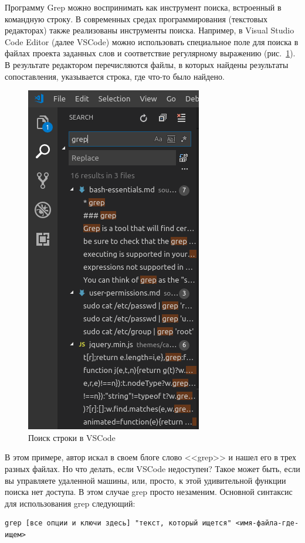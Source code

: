 \documentclass[12pt]{article}
\begin{document}
Программу Grep можно воспринимать как инструмент поиска, встроенный в командную
строку. В современных средах программирования (текстовых редакторах)
также реализованы инструменты поиска. Например, в Visual Studio Code Editor (далее VSCode)
можно использовать специальное поле для поиска в файлах проекта
заданных слов и соответствие регулярному выражению (рис.~\ref{fig:vscodesearch}). В
результате редактором перечисляются файлы, в которых найдены
результаты сопоставления, указывается строка, где что-то было найдено.
\begin{figure}[tbh]\centering

\includegraphics[width=0.5\linewidth]{blog/2019/bash-essentials/vscode-search.png}

\caption{Поиск строки в VSCode}
\label{fig:vscodesearch}
\end{figure}
В этом примере, автор искал в своем блоге слово <<grep>> и нашел его в
трех разных файлах. Но что делать, если VSCode недоступен? Такое может
быть, если вы управляете удаленной машины, или, просто, к этой
удивительной функции поиска нет доступа. В этом случае grep просто
незаменим. Основной синтаксис для использования grep следующий:

\begin{verbatim}
grep [все опции и ключи здесь] "текст, который ищется" <имя-файла-где-ищем>
\end{verbatim}
\end{document}
